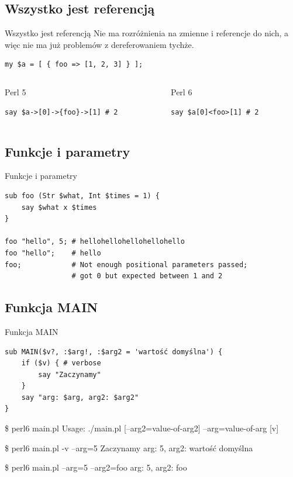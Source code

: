 \documentclass{beamer}
\begin{document}
			\subsection{Wszystko jest referencją}
\begin{frame}[fragile]{Wszystko jest referencją}
	Nie ma rozróżnienia na zmienne i referencje do nich,
	a więc nie ma już problemów z dereferowaniem tychże.
	\begin{verbatim}
my $a = [ { foo => [1, 2, 3] } ];
	\end{verbatim}
	\begin{columns}[t]
		\begin{column}{0.5\textwidth}
			\begin{block}{Perl 5}
				\begin{verbatim}
say $a->[0]->{foo}->[1] # 2
				\end{verbatim}
			\end{block}
		\end{column}
		\begin{column}{0.5\textwidth}
			\begin{block}{Perl 6}
				\begin{verbatim}
say $a[0]<foo>[1] # 2
				\end{verbatim}
			\end{block}
		\end{column}
	\end{columns}
\end{frame}
			\subsection{Funkcje i parametry}
\begin{frame}[fragile]{Funkcje i parametry}
	\begin{verbatim}
sub foo (Str $what, Int $times = 1) {
    say $what x $times
}

foo "hello", 5; # hellohellohellohellohello
foo "hello";    # hello
foo;            # Not enough positional parameters passed;
                # got 0 but expected between 1 and 2
	\end{verbatim}
\end{frame}
			\subsection{Funkcja MAIN}
\begin{frame}[fragile]{Funkcja MAIN}
\small
\begin{verbatim}
sub MAIN($v?, :$arg!, :$arg2 = 'wartość domyślna') {
    if ($v) { # verbose
        say "Zaczynamy"
    }
    say "arg: $arg, arg2: $arg2"
}
\end{verbatim}
\begin{semiverbatim}
\$ \alert{perl6 main.pl}
Usage:
./main.pl [--arg2=value-of-arg2] --arg=value-of-arg [v]

\$ \alert{perl6 main.pl -v --arg=5}
Zaczynamy
arg: 5, arg2: wartość domyślna

\$ \alert{perl6 main.pl --arg=5 --arg2=foo}
arg: 5, arg2: foo
\end{semiverbatim}
\end{frame}
\end{document}
